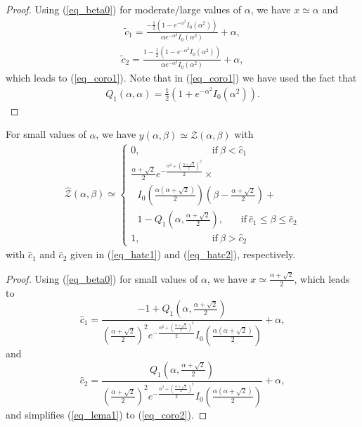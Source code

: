 \begin{proof}
Using (\ref{eq_beta0}) for moderate/large values of $\alpha$, we have $x \simeq \alpha$ and
\begin{align}
        \tilde{c}_1 = \frac{-\frac{1}{2}\left(1-e^{-\alpha^2}I_0(\alpha^2)\right)}{\alpha e^{-\alpha^2}I_0(\alpha^2)}+\alpha,
\end{align}
\begin{align}
     \tilde{c}_2 = \frac{1-\frac{1}{2}\left(1-e^{-\alpha^2}I_0(\alpha^2)\right)}{\alpha e^{-\alpha^2}I_0(\alpha^2)}+\alpha,
\end{align}
which leads to (\ref{eq_coro1}). Note that in (\ref{eq_coro1}) we have used the fact that \cite[Eq.  (A-3-2)]{schwartz1995communication}
\begin{align}
    Q_1(\alpha,\alpha) = \frac{1}{2}\left(1+e^{-\alpha^2}I_0(\alpha^2)\right).
\end{align}
\end{proof}

\begin{corollary}\label{coro2}
For small values of $\alpha$, we have  $y(\alpha,\beta)\simeq\hat{ \mathcal{Z}}(\alpha,\beta)$ with
\begin{align}\label{eq_coro2}
\hat{ \mathcal{Z}}(\alpha,\beta)\simeq
\begin{cases}
0,   ~~~~~~~~~~~~~~~~~~~~~~~~~~~~~~~~~\mathrm{if}~\beta < \hat{c}_1  \\ 
\frac{\alpha+\sqrt{2}}{2}  e^{-\frac{\alpha^2+\left(\frac{\alpha+\sqrt{2}}{2}\right)^2}{2}}\times\\
~~~I_0\left(\frac{\alpha(\alpha+\sqrt{2})}{2}\right)(\beta-\frac{\alpha+\sqrt{2}}{2}) + \\
~~~1-Q_1\left(\alpha,\frac{\alpha+\sqrt{2}}{2}\right), 
~~~~~~~~\mathrm{if}~\hat{c}_1 \leq\beta\leq \hat{c}_2 \\
1, ~~~~~~~~~~~~~~~~~~~~~~~~~~~~~~~~~\mathrm{if}~ \beta> \hat{c}_2
\end{cases}
\end{align}
with $\hat{c}_1$ and $\hat{c}_2$ given in (\ref{eq_hatc1}) and (\ref{eq_hatc2}), respectively.
\end{corollary}
\begin{proof}
Using (\ref{eq_beta0}) for small values of $\alpha$, we have $x\simeq \frac{\alpha+\sqrt{2}}{2}$, which leads to 
\begin{equation}\label{eq_hatc1}
    \hat{c}_1 = \frac{-1+Q_1\left(\alpha,\frac{\alpha+\sqrt{2}}{2}\right)}{\left(\frac{\alpha+\sqrt{2}}{2} \right)^2 e^{-\frac{\alpha^2+\left(\frac{\alpha+\sqrt{2}}{2}\right)^2}{2}} I_0\left(\frac{\alpha(\alpha+\sqrt{2})}{2}\right)}+\alpha,
\end{equation}
and
\begin{equation}\label{eq_hatc2}
    \hat{c}_2 = \frac{Q_1\left(\alpha,\frac{\alpha+\sqrt{2}}{2}\right)}{\left(\frac{\alpha+\sqrt{2}}{2} \right)^2 e^{-\frac{\alpha^2+\left(\frac{\alpha+\sqrt{2}}{2}\right)^2}{2}} I_0\left(\frac{\alpha(\alpha+\sqrt{2})}{2}\right)}+\alpha,
\end{equation}
and simplifies (\ref{eq_lema1}) to (\ref{eq_coro2}).
\end{proof}



